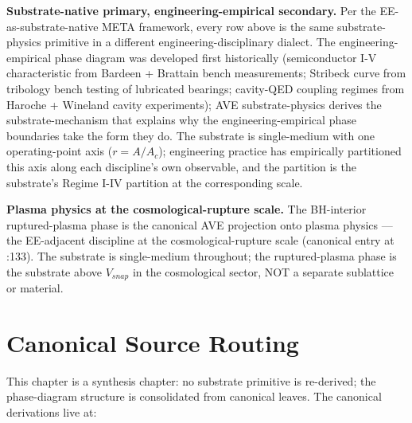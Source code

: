 \noindent
\textbf{Substrate-native primary, engineering-empirical secondary.} Per the EE-as-substrate-native META framework, every row above is the same substrate-physics primitive in a different engineering-disciplinary dialect. The engineering-empirical phase diagram was developed first historically (semiconductor I-V characteristic from Bardeen + Brattain bench measurements; Stribeck curve from tribology bench testing of lubricated bearings; cavity-QED coupling regimes from Haroche + Wineland cavity experiments); AVE substrate-physics derives the substrate-mechanism that explains why the engineering-empirical phase boundaries take the form they do. The substrate is single-medium with one operating-point axis ($r = A/A_c$); engineering practice has empirically partitioned this axis along each discipline's own observable, and the partition is the substrate's Regime I-IV partition at the corresponding scale.

\textbf{Plasma physics at the cosmological-rupture scale.} The BH-interior ruptured-plasma phase is the canonical AVE projection onto plasma physics --- the EE-adjacent discipline at the cosmological-rupture scale (canonical entry at :133). The substrate is single-medium throughout; the ruptured-plasma phase is the substrate above $V_{snap}$ in the cosmological sector, NOT a separate sublattice or material.

\section{Canonical Source Routing}
\label{sec:vol9_phase_canonical_sources}

This chapter is a synthesis chapter: no substrate primitive is re-derived; the phase-diagram structure is consolidated from canonical leaves. The canonical derivations live at:

